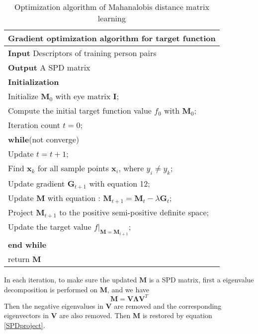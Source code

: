 \begin{table}[H]
 \centering
 \caption{Optimization algorithm of Mahanalobis distance matrix learning}
 \begin{tabular}{l}
 \hline 
 \multicolumn{1}{l}{\textbf{Gradient optimization algorithm for target function}} \\
 \hline
 \textbf{Input} Descriptors of training person pairs \\
 \textbf{Output} A SPD matrix\\
 \textbf{Initialization} \\
 Initialize $\bm{M}_0$ with eye matrix $\bm{I}$; \\
 Compute the initial target function value $f_0$ with $\bm{M}_0$;\\
 Iteration count  $t = 0$;\\

 \textbf{while}(not converge)\\
 \indent Update $t =  t + 1$;\\
 \indent Find $\bm{x}_k$ for all sample points $\bm{x}_i$, where $y_i \ne y_k$;\\
 \indent Update gradient $\bm{G}_{t+1}$ with equation 12;\\
 \indent Update $\bm{M}$ with equation : $\bm{M}_{t+1} = \bm{M}_{t} - \lambda\bm{G}_t$;\\
 \indent Project $\bm{M}_{t+1}$ to the positive semi-positive definite space; \\ 
 \indent Update the target value $f|_{\bm{M} = \bm{M}_{t+1}}$;\\
 \textbf{end while}  \\
 return $\bm{M}$\\
 \hline
 \end{tabular} 
 \end{table}
 \label{Gradientdemo}
In each iteration, to make sure the updated $\bm{M}$ is a SPD matrix, first a eigenvalue decomposition is performed on $\bm{M}$, and we have
\begin{equation}\label{SPDproject}
\bm{M} = \bm{V}\bm{\Lambda}\bm{V}^T
\end{equation}
Then the negative eigenvalues in $\bm{V}$ are removed and the corresponding eigenvectors in $\bm{V}$ are also removed. Then $\bm{M}$ is restored by equation \eqref{SPDproject}.

 
 
 
 
 
